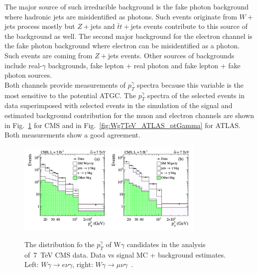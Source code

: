 The major source of such irreducible background is the fake photon background where hadronic jets are misidentified as photons. Such events originate from $W+$jets process mostly but $Z+$jets and $\bar{t}t+$jets events contribute to this source of the background as well. The second major background for the electron channel is the fake photon background where electron can be misidentified as a photon.  Such events are coming from $Z+$jets events. Other sources of backgrounds include real-$\gamma$ backgrounds, fake lepton + real photon and fake lepton + fake photon sources.\\

Both channels provide measurements of $p_T^\gamma$ spectra because this variable is the most sensitive to the potential ATGC. The $p_T^\gamma$ spectra of the selected events in data superimposed with selected events in the simulation of the signal and estimated background contribution for the muon and electron channels are shown in Fig.~\ref{fig:Wg7TeV_CMS_ptGamma} for CMS and in Fig.~\ref{fig:Wg7TeV_ATLAS_ptGamma} for ATLAS. Both measurements show a good agreement.\\

\begin{figure}[htb]
  \begin{center}
    {\includegraphics[width=0.80\textwidth]{../figs/WgAbout/Wg7TeV_CMS_ptGamma.png}}
    \caption{The distribution fo the $p_T^\gamma$ of W$\gamma$ candidates in the analysis of~7~TeV CMS data. Data vs signal MC + background estimates. Left: $W\gamma\rightarrow e\nu\gamma$, right: $W\gamma\rightarrow \mu\nu\gamma$~\cite{ref_7TeV_CMS}.}
    \label{fig:Wg7TeV_CMS_ptGamma}
  \end{center}
\end{figure}

